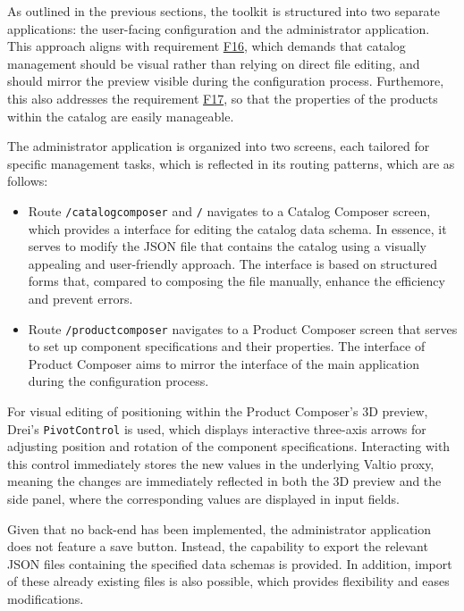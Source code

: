 As outlined in the previous sections, the toolkit is structured into two separate applications: the user-facing configuration and the administrator application. This approach aligns with requirement \hyperref[itm:F16]{F16}, which demands that catalog management should be visual rather than relying on direct file editing, and should mirror the preview visible during the configuration process. Furthemore, this also addresses the requirement \hyperref[itm:F17]{F17}, so that the properties of the products within the catalog are easily manageable.

The administrator application is organized into two screens, each tailored for specific management tasks, which is reflected in its routing patterns, which are as follows:
\begin{itemize}[label=\rectanglebullet]
    \item Route \texttt{/catalogcomposer} and \texttt{/} navigates to a Catalog Composer screen, which provides a interface for editing the catalog data schema. In essence, it serves to modify the JSON file that contains the catalog using a visually appealing and user-friendly approach. The interface is based on structured forms that, compared to composing the file manually, enhance the efficiency and prevent errors. 
    
    \item Route \texttt{/productcomposer} navigates to a Product Composer screen that serves to set up component specifications and their properties. The interface of Product Composer aims to mirror the interface of the main application during the configuration process.
\end{itemize} 
    
For visual editing of positioning within the Product Composer's 3D preview, Drei's \texttt{PivotControl} is used, which displays interactive three-axis arrows for adjusting position and rotation of the component specifications. Interacting with this control immediately stores the new values in the underlying Valtio proxy, meaning the changes are immediately reflected in both the 3D preview and the side panel, where the corresponding values are displayed in input fields. 

Given that no back-end has been implemented, the administrator application does not feature a save button. Instead, the capability to export the relevant JSON files containing the specified data schemas is provided. In addition, import of these already existing files is also possible, which provides flexibility and eases modifications.

